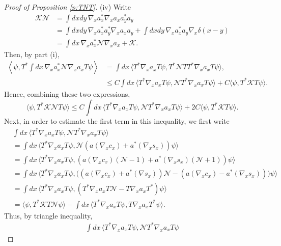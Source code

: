 \documentclass[11pt,a4paper]{scrartcl}
\newcommand{\N}{\mathcal{N}}
\newcommand{\K}{\mathcal{K}}
\begin{document}
\begin{proof}[Proof of Proposition \ref{p:TNT}]
  (iv) Write
  \begin{align*}
    \K \N & = \int dx dy \, \nabla_x a_x^* \nabla_x a_x a_y^* a_y \\
    & = \int dx dy \, \nabla_x a_x^* a_y^* \nabla_x a_x a_y + \int dx dy \,
    \nabla_x a_x^* a_y \nabla_x \delta(x-y) \\
    & = \int dx \, \nabla_x a_x^* \N \nabla_x a_x + \K.
  \end{align*}
  Then, by part (i),
  \begin{align*}
    \left \langle \psi, T^* \int dx \, \nabla_x a_x^* \N \nabla_x a_x T \psi
    \right \rangle & = \int dx \, \langle T^* \nabla_x a_x T \psi, T^* \N T
    T^* \nabla_x a_x T \psi \rangle, \\
    & \le C \int dx \, \langle T^* \nabla_x a_x T \psi, \N T^* \nabla_x a_x T
    \psi \rangle + C \langle \psi, T^* \K T \psi \rangle.
  \end{align*}
  Hence, combining these two expressions,
  \begin{equation}
    \label{ep5}
    \langle \psi, T^* \K \N T \psi \rangle \le C \int dx \, \langle T^*
    \nabla_x a_x T \psi, \N T^* \nabla_x a_x T \psi \rangle + 2C \langle \psi,
    T^* \K T \psi \rangle.
  \end{equation}
  Next, in order to estimate the first term in this inequality, we first write
  \begin{align*}
    & \int dx \, \langle T^* \nabla_x a_x T \psi, \N T^* \nabla_x a_x T \psi
    \rangle \\
    & = \int dx \, \langle T^* \nabla_x a_x T \psi, \N ( a(\nabla_x c_x) +
    a^*(\nabla_x s_x) ) \psi \rangle \\
    & = \int dx \, \langle T^* \nabla_x a_x T \psi, ( a(\nabla_x c_x) (\N-1) +
    a^*(\nabla_x s_x) (\N+1) ) \psi \rangle \\
    & = \int dx \, \langle T^* \nabla_x a_x T \psi, \big( (a(\nabla_x c_x) +
    a^*(\nabla s_x)) \N - (a(\nabla_x c_x) - a^*(\nabla_x s_x)) \big) \psi
    \rangle \\
    & = \int dx \, \langle T^* \nabla_x a_x T \psi, ( T^* \nabla_x a_x T \N -
    T \nabla_x a_x T^* ) \psi \rangle \\
    & = \langle \psi, T^* \K T \N \psi \rangle - \int dx \, \langle T^*
    \nabla_x a_x T \psi, T \nabla_x a_x T^* \psi \rangle.
  \end{align*}
  Thus, by triangle inequality,
  \begin{align*}
    \int dx \, \langle T^* \nabla_x a_x T \psi, \N T^* \nabla_x a_x T \psi

\end{align*}
\end{proof}
\end{document}
